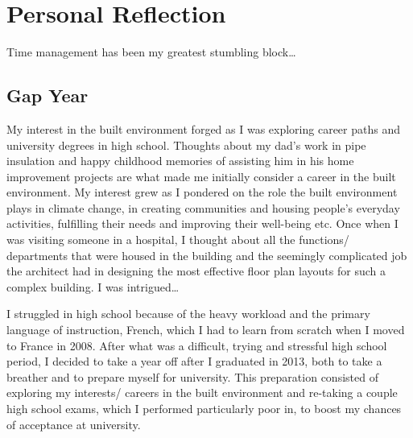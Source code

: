 \chapter{Personal Reflection} %

\label{Chapter4} %



Time management has been my greatest stumbling block…



\section{Gap Year}

My interest in the built environment forged as I was exploring career paths and university degrees in high school.
Thoughts about my dad’s work in pipe insulation and happy childhood memories of assisting him in his home improvement projects are what made me initially consider a career in the built environment.
My interest grew as I pondered on the role the built environment plays in climate change, in creating communities and housing people’s everyday activities, fulfilling their needs and improving their well-being etc.
Once when I was visiting someone in a hospital, I thought about all the functions/ departments that were housed in the building and the seemingly complicated job the architect had in designing the most effective floor plan layouts for such a complex building.
I was intrigued…

I struggled in high school because of the heavy workload and the primary language of instruction, French, which I had to learn from scratch when I moved to France in 2008.
After what was a difficult, trying and stressful high school period, I decided to take a year off after I graduated in 2013, both to take a breather and to prepare myself for university.
This preparation consisted of exploring my interests/ careers in the built environment and re-taking a couple high school exams, which I performed particularly poor in, to boost my chances of acceptance at university.


